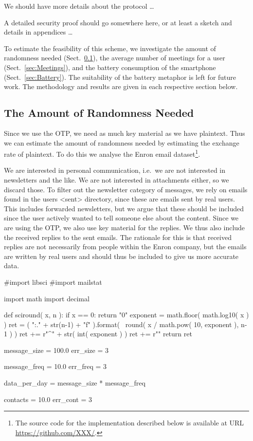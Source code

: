 We should have more details about the protocol \dots

A detailed security proof should go somewhere here, or at least a sketch and 
details in appendices \dots

To estimate the feasibility of this scheme, we investigate the amount of 
randomness needed (Sect.~\ref{sec:NeededRandomness}), the average number of 
meetings for a user (Sect.~\ref{sec:Meetings}), and the battery consumption of 
the smartphone (Sect.~\ref{sec:Battery}).
The suitability of the battery metaphor is left for future work.
The methodology and results are given in each respective section below.

\subsection{The Amount of Randomness Needed}
\label{sec:NeededRandomness}
Since we use the \ac{OTP}, we need as much key material as we have plaintext.
Thus we can estimate the amount of randomness needed by estimating the exchange 
rate of plaintext.
To do this we analyse the Enron email dataset\footnote{%
  The source code for the implementation described below is available at URL 
  \url{https://github.com/XXX/}.
}.

We are interested in personal communication, i.e.~we are not interested in 
newsletters and the like.
We are not interested in attachments either, so we discard those.
To filter out the newsletter category of messages, we rely on emails found in 
the users <sent> directory, since these are emails sent by real users.
This includes forwarded newsletters, but we argue that these should be included 
since the user actively wanted to tell someone else about the content.
Since we are using the \ac{OTP}, we also use key material for the replies.
We thus also include the received replies to the sent emails.
The rationale for this is that received replies are not necessarily from people 
within the Enron company, but the emails are written by real users and should 
thus be included to give us more accurate data.

\begin{pycode}[random]
#import libsci
#import mailstat

import math
import decimal

def sciround( x, n ):
  if x == 0:
    return "0"
  exponent = math.floor( math.log10( x ) )
  ret = ( "{:." + str(n-1) + "f}" ).format( \
    round( x / math.pow( 10, exponent ), n-1 ) )
  ret += r"^{" + str( int( exponent ) )
  ret += r"}"
  return ret

message_size = 100.0
err_size = 3

message_freq = 10.0
err_freq = 3

data_per_day = message_size * message_freq

contacts = 10.0
err_cont = 3
\end{pycode}

